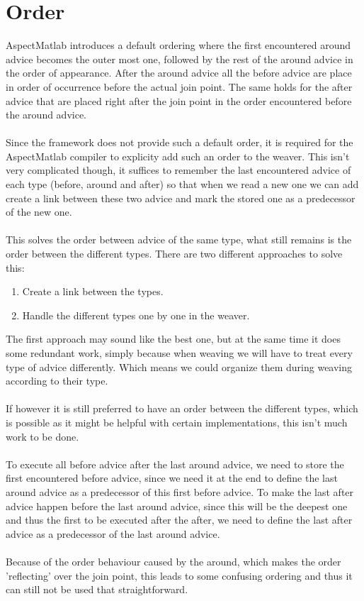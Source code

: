 \documentclass[a4paper]{report}
\begin{document}
\section{Order}
AspectMatlab introduces a default ordering where the first encountered around advice becomes the outer most one, followed by the rest of the around advice in the order of appearance. After the around advice all the before advice are place in order of occurrence before the actual join point. The same holds for the after advice that are placed right after the join point in the order encountered before the around advice.\\
\\
Since the framework does not provide such a default order, it is required for the AspectMatlab compiler to explicity add such an order to the weaver. This isn't very complicated though, it suffices to remember the last encountered advice of each type (before, around and after) so that when we read a new one we can add create a link between these two advice and mark the stored one as a predecessor of the new one.\\
\\
This solves the order between advice of the same type, what still remains is the order between the different types. There are two different approaches to solve this:
\begin{enumerate}
\item Create a link between the types.
\item Handle the different types one by one in the weaver.
\end{enumerate}
The first approach may sound like the best one, but at the same time it does some redundant work, simply because when weaving we will have to treat every type of advice differently. Which means we could organize them during weaving according to their type.\\
\\
If however it is still preferred to have an order between the different types, which is possible as it might be helpful with certain implementations, this isn't much work to be done.\\
\\
To execute all before advice after the last around advice, we need to store the first encountered before advice, since we need it at the end to define the last around advice as a predecessor of this first before advice. To make the last after advice happen before the last around advice, since this will be the deepest one and thus the first to be executed after the after, we need to define the last after advice as a predecessor of the last around advice. \\
\\
Because of the order behaviour caused by the around, which makes the order 'reflecting' over the join point, this leads to some confusing ordering and thus it can still not be used that straightforward.
\end{document}

